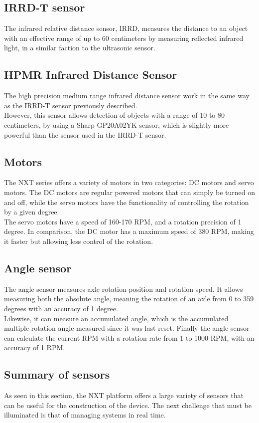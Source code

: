 \subsection*{IRRD-T sensor}
The infrared relative distance sensor, IRRD, measures the distance to an object with an effective range of up to 60 centimeters by measuring reflected infrared light, in a similar faction to the ultrasonic sensor.

\subsection*{HPMR Infrared Distance Sensor}
The high precision medium range infrared distance sensor work in the same way as the IRRD-T sensor previously described.\\
However, this sensor allows detection of objects with a range of 10 to 80 centimeters, by using a Sharp GP20A02YK sensor, which is slightly more powerful than the sensor used in the IRRD-T sensor.

\subsection*{Motors}
The NXT series offers a variety of motors in two categories: DC motors and servo motors.
The DC motors are regular powered motors that can simply be turned on and off, while the servo motors have the functionality of controlling the rotation by a given degree.\\
The servo motors have a speed of 160-170 RPM, and a rotation precision of 1 degree.
In comparison, the DC motor has a maximum speed of 380 RPM, making it faster but allowing less control of the rotation.

\subsection*{Angle sensor}
The angle sensor measures axle rotation position and rotation speed.
It allows measuring both the absolute angle, meaning the rotation of an axle from 0 to 359 degrees with an accuracy of 1 degree.\\
Likewise, it can measure an accumulated angle, which is the accumulated multiple rotation angle measured since it was last reset.
Finally the angle sensor can calculate the current RPM with a rotation rate from 1 to 1000 RPM, with an accuracy of 1 RPM.

\subsection*{Summary of sensors}
As seen in this section, the NXT platform offers a large variety of sensors that can be useful for the construction of the device.
The next challenge that must be illuminated is that of managing systems in real time.
